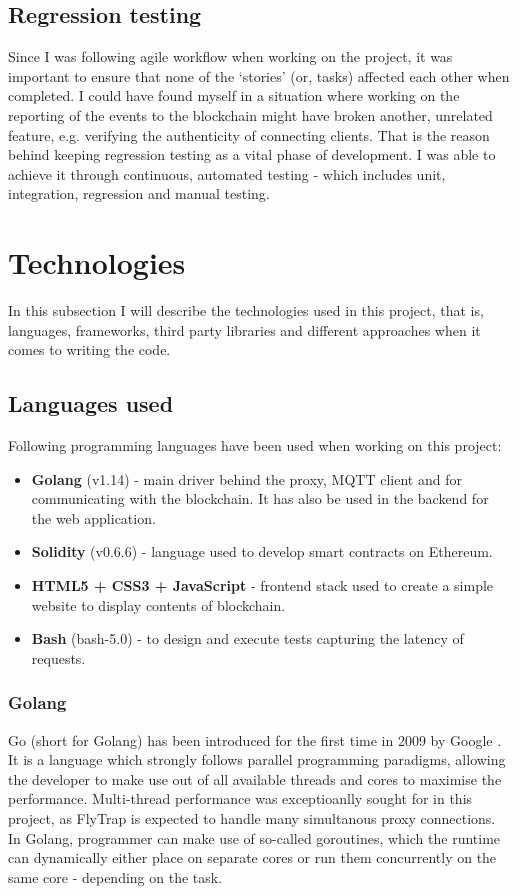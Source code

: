 \subsection{Regression testing}

Since I was following agile workflow when working on the project, it was important to ensure that none of the `stories' (or, tasks) affected each other when completed. I could have found myself in a situation where working on the reporting of the events to the blockchain might have broken another, unrelated feature, e.g. verifying the authenticity of connecting clients. That is the reason behind keeping regression testing as a vital phase of development. I was able to achieve it through continuous, automated testing - which includes unit, integration, regression and manual testing.

\section{Technologies}

In this subsection I will describe the technologies used in this project, that is, languages, frameworks, third party libraries and different approaches when it comes to writing the code.

\subsection{Languages used}

Following programming languages have been used when working on this project:
\begin{itemize}
 \item \textbf{Golang} (v1.14) - main driver behind the proxy, MQTT client and for communicating with the blockchain. It has also be used in the backend for the web application.
 \item \textbf{Solidity} (v0.6.6) - language used to develop smart contracts on Ethereum.
 \item \textbf{HTML5 + CSS3 + JavaScript} - frontend stack used to create a simple website to display contents of blockchain.
 \item \textbf{Bash} (bash-5.0) - to design and execute tests capturing the latency of requests.
\end{itemize}

\subsubsection{Golang}
Go (short for Golang) has been introduced for the first time in 2009 by Google \cite{team2009go}. It is a language which strongly follows parallel programming paradigms, allowing the developer to make use out of all available threads and cores to maximise the performance. Multi-thread performance was exceptioanlly sought for in this project, as FlyTrap is expected to handle many simultanous proxy connections. In Golang, programmer can make use of so-called goroutines, which the runtime can dynamically either place on separate cores or run them concurrently on the same core - depending on the task.

